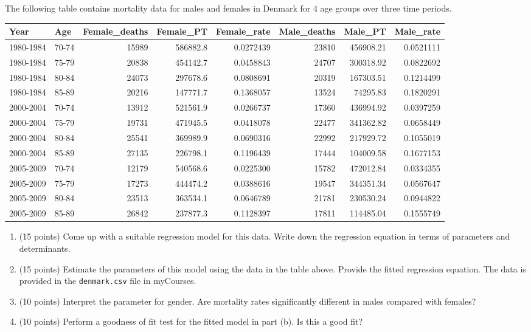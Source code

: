 \documentclass[letterpaper,12pt,twoside,]{pinp}
\providecommand{\tightlist}{%
  \setlength{\itemsep}{0pt}\setlength{\parskip}{0pt}}
\begin{document}
The following table contains mortality data for males and females in
Denmark for 4 age groups over three time periods.

\vspace*{0.3in}

\begin{tabular}{l|l|r|r|r|r|r|r}
\hline
Year & Age & Female\_deaths & Female\_PT & Female\_rate & Male\_deaths & Male\_PT & Male\_rate\\
\hline
1980-1984 & 70-74 & 15989 & 586882.8 & 0.0272439 & 23810 & 456908.21 & 0.0521111\\
\hline
1980-1984 & 75-79 & 20838 & 454142.7 & 0.0458843 & 24707 & 300318.92 & 0.0822692\\
\hline
1980-1984 & 80-84 & 24073 & 297678.6 & 0.0808691 & 20319 & 167303.51 & 0.1214499\\
\hline
1980-1984 & 85-89 & 20216 & 147771.7 & 0.1368057 & 13524 & 74295.83 & 0.1820291\\
\hline
2000-2004 & 70-74 & 13912 & 521561.9 & 0.0266737 & 17360 & 436994.92 & 0.0397259\\
\hline
2000-2004 & 75-79 & 19731 & 471945.5 & 0.0418078 & 22477 & 341362.82 & 0.0658449\\
\hline
2000-2004 & 80-84 & 25541 & 369989.9 & 0.0690316 & 22992 & 217929.72 & 0.1055019\\
\hline
2000-2004 & 85-89 & 27135 & 226798.1 & 0.1196439 & 17444 & 104009.58 & 0.1677153\\
\hline
2005-2009 & 70-74 & 12179 & 540568.6 & 0.0225300 & 15782 & 472012.84 & 0.0334355\\
\hline
2005-2009 & 75-79 & 17273 & 444474.2 & 0.0388616 & 19547 & 344351.34 & 0.0567647\\
\hline
2005-2009 & 80-84 & 23513 & 363534.1 & 0.0646789 & 21781 & 230530.24 & 0.0944822\\
\hline
2005-2009 & 85-89 & 26842 & 237877.3 & 0.1128397 & 17811 & 114485.04 & 0.1555749\\
\hline
\end{tabular}

\begin{enumerate}
\def\labelenumi{\alph{enumi}.}
\tightlist
\item
  (15 points) Come up with a suitable regression model for this data.
  Write down the regression equation in terms of parameters and
  determinants.
\item
  (15 points) Estimate the parameters of this model using the data in
  the table above. Provide the fitted regression equation. The data is
  provided in the \texttt{denmark.csv} file in myCourses.
\item
  (10 points) Interpret the parameter for gender. Are mortality rates
  significantly different in males compared with females?
\item
  (10 points) Perform a goodness of fit test for the fitted model in
  part (b). Is this a good fit?
\end{enumerate}





\end{document}
